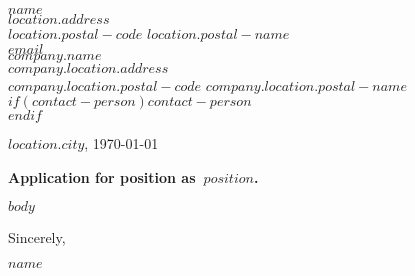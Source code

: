 \documentclass[]{$documentclass$}
\def\thetitle{Søknad om stilling som}
\def\sign{Med vennlig hilsen}
\def\thetitle{Application for position as}
\def\sign{Sincerely}
\begin{document}
{\selectfont\thispagestyle{empty}
    $name$\\
    $location.address$\\
    $location.postal-code$ $location.postal-name$\\
    $email$\\

    $company.name$\\
    $company.location.address$\\
    $company.location.postal-code$ $company.location.postal-name$\\
    $if(contact-person)$$contact-person$\\$endif$

    \hfill $location.city$, \today

    \vspace{1em}
    {\Large\textbf{\thetitle\ $position$.}}

    $body$

    \vspace{2em}
    \sign,
    
    $name$

}
\end{document}
